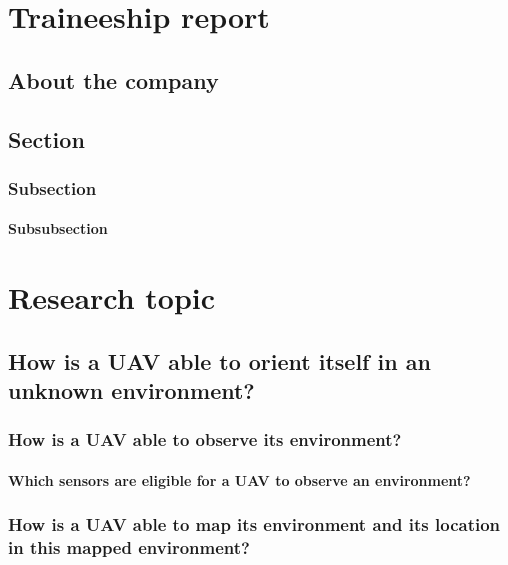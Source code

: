 \documentclass[12pt,a4paper]{report}
\begin{document}
  

  \blankpage

  



  \tableofcontents

  \listoffigures

  \listoftables

  \printglossary[title={List of Abbreviations}]


  \chapter{Traineeship report}
    \section{About the company}
    \section{Section}
      \subsection{Subsection}
        \subsubsection{Subsubsection}

  \chapter{Research topic}
    \section{How is a UAV able to orient itself in an unknown environment?}
      \subsection{How is a UAV able to observe its environment?}
        \subsubsection{Which sensors are eligible for a UAV to observe an environment?}
      \subsection{How is a UAV able to map its environment and its location in this mapped environment?}
\end{document}
